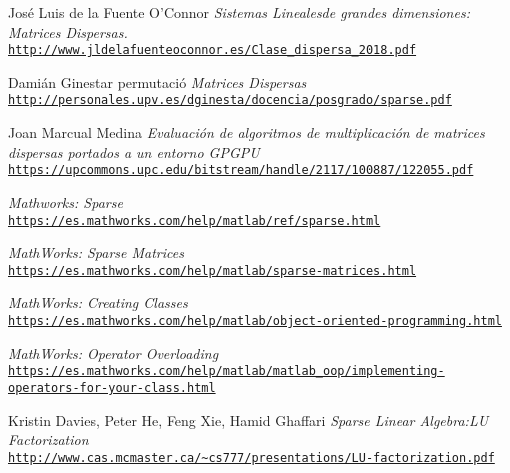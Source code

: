 \documentclass[11pt,a4paper,twoside]{report}
\begin{document}
\begin{thebibliography}{9}

    José Luis de la Fuente O’Connor
    \textit{Sistemas Linealesde grandes dimensiones: Matrices Dispersas.}
    \\\texttt{\url{http://www.jldelafuenteoconnor.es/Clase\_dispersa\_2018.pdf}}

    Damián Ginestar permutació
    \textit{Matrices Dispersas}
    \\\texttt{\url{http://personales.upv.es/dginesta/docencia/posgrado/sparse.pdf}}

    Joan Marcual Medina \textit{Evaluación de algoritmos de multiplicación de matrices
    dispersas portados a un entorno
    GPGPU}
    \\\texttt{\url{https://upcommons.upc.edu/bitstream/handle/2117/100887/122055.pdf}}

    \textit{Mathworks: Sparse}
    \\\texttt{\url{https://es.mathworks.com/help/matlab/ref/sparse.html}}

    \textit{MathWorks: Sparse Matrices}
    \\\texttt{\url{https://es.mathworks.com/help/matlab/sparse-matrices.html}}

    \textit{MathWorks: Creating Classes}
    \\\texttt{\url{https://es.mathworks.com/help/matlab/object-oriented-programming.html}}

    
    \textit{MathWorks: Operator Overloading}
    \\\texttt{\url{https://es.mathworks.com/help/matlab/matlab_oop/implementing-operators-for-your-class.html}}

    Kristin Davies,
    Peter He,
    Feng Xie,
    Hamid Ghaffari  
    \textit{Sparse Linear Algebra:LU Factorization}
    \\\texttt{\url{http://www.cas.mcmaster.ca/~cs777/presentations/LU-factorization.pdf}}

    


\end{thebibliography}
      
\end{document}

